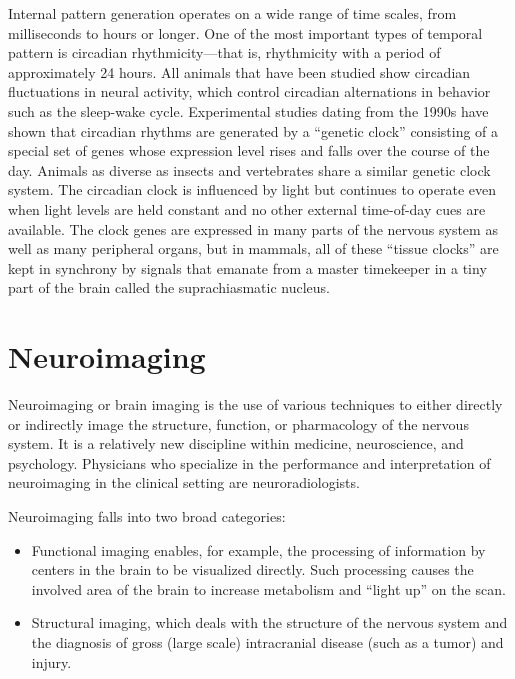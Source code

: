 Internal pattern generation operates on a wide range of time scales, from milliseconds to hours or longer. One of the most important types of temporal pattern is circadian rhythmicity---that is, rhythmicity with a period of approximately 24 hours. All animals that have been studied show circadian fluctuations in neural activity, which control circadian alternations in behavior such as the sleep-wake cycle. Experimental studies dating from the 1990s have shown that circadian rhythms are generated by a ``genetic clock'' consisting of a special set of genes whose expression level rises and falls over the course of the day. Animals as diverse as insects and vertebrates share a similar genetic clock system. The circadian clock is influenced by light but continues to operate even when light levels are held constant and no other external time-of-day cues are available. The clock genes are expressed in many parts of the nervous system as well as many peripheral organs, but in mammals, all of these ``tissue clocks'' are kept in synchrony by signals that emanate from a master timekeeper in a tiny part of the brain called the suprachiasmatic nucleus.

\hypertarget{neuroimaging}{%
\section{Neuroimaging}\label{neuroimaging}}

Neuroimaging or brain imaging is the use of various techniques to either directly or indirectly image the structure, function, or pharmacology of the nervous system. It is a relatively new discipline within medicine, neuroscience, and psychology. Physicians who specialize in the performance and interpretation of neuroimaging in the clinical setting are neuroradiologists.

Neuroimaging falls into two broad categories:

\begin{itemize}
\tightlist
\item
  Functional imaging enables, for example, the processing of information by centers in the brain to be visualized directly. Such processing causes the involved area of the brain to increase metabolism and ``light up'' on the scan.
\item
  Structural imaging, which deals with the structure of the nervous system and the diagnosis of gross (large scale) intracranial disease (such as a tumor) and injury.
\end{itemize}

